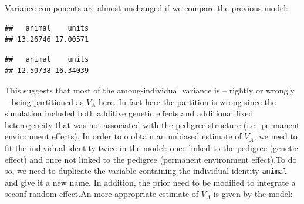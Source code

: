 \documentclass[
  12pt,
]{book}
\newenvironment{Shaded}{\begin{snugshade}}{\end{snugshade}}
\newcommand{\FloatTok}[1]{\textcolor[rgb]{0.00,0.00,0.81}{#1}}
\newcommand{\KeywordTok}[1]{\textcolor[rgb]{0.13,0.29,0.53}{\textbf{#1}}}
\newcommand{\NormalTok}[1]{#1}
\newcommand{\OperatorTok}[1]{\textcolor[rgb]{0.81,0.36,0.00}{\textbf{#1}}}
\begin{document}
Variance components are almost unchanged if we compare the previous model:

\begin{Shaded}
\end{Shaded}

\begin{verbatim}
##   animal    units 
## 13.26746 17.00571
\end{verbatim}

\begin{Shaded}
\end{Shaded}

\begin{verbatim}
##   animal    units 
## 12.50738 16.34039
\end{verbatim}

This suggests that most of the among-individual variance is -- rightly or wrongly -- being partitioned as \(V_A\) here. In fact here the partition is wrong since the simulation included both additive genetic effects and additional fixed heterogeneity that was not associated with the pedigree structure (i.e.~permanent environment effects).
In order to o obtain an unbiased estimate of \(V_A\), we need to fit the individual identity twice in the model: once linked to the pedigree (genetic effect) and once not linked to the pedigree (permanent environment effect).To do so, we need to duplicate the variable containing the individual identity \texttt{animal} and give it a new name. In addition, the prior need to be modified to integrate a seconf random effect.An more appropriate estimate of \(V_A\) is given by the model:
\end{document}
